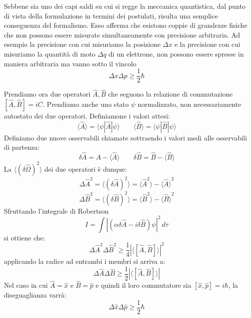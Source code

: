 Sebbene sia uno dei capi saldi su cui si regge la meccanica quantistica, dal punto di vista della formulazione in termini dei postulati, risulta una semplice conseguenza del formalismo. Esso afferma che esistono coppie di grandezze fisiche che non possono essere misurate simultaneamente con precisione arbitraria. Ad esempio la precisione con cui misuriamo la posizione $\Delta x$ e la precisione con cui misuriamo la quantità di moto $\Delta q$ di un elettrone, non possono essere spresse in maniera arbitraria ma vanno sotto il vincolo
$$ \Delta x \Delta p \ge \frac{1}{2} \hbar$$

Prendiamo ora due operatori $\hat{A}, \hat{B}$ che seguono la relazione di commutazione $[\hat{A}, \hat{B}] = iC$. Prendiamo anche uno stato $\psi$ normalizzato, non necessariamente autostato dei due operatori. Definiamone i valori attesi:
$$\langle \hat{A} \rangle = \langle \psi | \hat{A} | \psi \rangle \qquad \langle \hat{B} \rangle = \langle \psi | \hat{B} | \psi \rangle$$
Definiamo due nuove osservabili chiamate  sottraendo i valori medi alle osservabili di partenza:
$$\delta \hat{A} = \hat{A} - \langle \hat{A} \rangle \qquad \delta \hat{B} = \hat{B} - \langle \hat{B} \rangle$$
La  $\langle (\delta\hat{\Omega})^2 \rangle$ dei due operatori è dunque:
$${\Delta \hat{A}}^2 = \langle (\delta \hat{A})^2 \rangle = \langle \hat{A}^2 \rangle - {\langle \hat{A} \rangle}^2 $$
$${\Delta \hat{B}}^2 = \langle (\delta \hat{B})^2 \rangle = \langle \hat{B}^2 \rangle - {\langle \hat{B} \rangle}^2$$
Sfruttando l'integrale di Robertson
$$ I = \int {|(\alpha \delta \hat{A} - i \delta \hat{B})\psi|}^2 \, d\tau$$
si ottiene che:
$$ {\Delta \hat{A}}^2 {\Delta \hat{B}}^2 \ge \frac{1}{4} {|\langle[\hat{A}, \hat{B}]\rangle|}^2$$
applicando la radice ad entrambi i membri si arriva a:
$$ \Delta \hat{A} \Delta \hat{B} \ge \frac{1}{2} |\langle[\hat{A}, \hat{B}]\rangle|$$
Nel caso in cui $\hat{A} = \hat{x}$ e $\hat{B} = \hat{p}$ e quindi il loro commutatore sia $[\hat{x}, \hat{p}] = i \hbar$, la diseguaglianza varrà:
$$ \Delta \hat{x} \Delta \hat{p} \ge \frac{1}{2} \hbar$$
